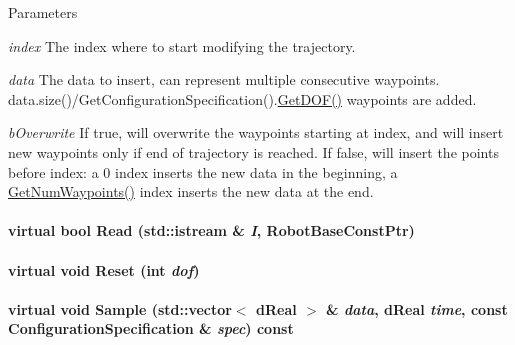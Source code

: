 \begin{DoxyParams}{Parameters}
\item[{\em index}]The index where to start modifying the trajectory. \item[{\em data}]The data to insert, can represent multiple consecutive waypoints. data.size()/GetConfigurationSpecification().\hyperlink{classOpenRAVE_1_1TrajectoryBase_a181d63496678472a4e902bcea6fea659}{GetDOF()} waypoints are added. \item[{\em bOverwrite}]If true, will overwrite the waypoints starting at index, and will insert new waypoints only if end of trajectory is reached. If false, will insert the points before index: a 0 index inserts the new data in the beginning, a \hyperlink{classOpenRAVE_1_1TrajectoryBase_aee0058cd9ab78480cbef78db3bf1fc75}{GetNumWaypoints()} index inserts the new data at the end. \end{DoxyParams}
\hypertarget{classOpenRAVE_1_1TrajectoryBase_ac92225ac78a03d41680a022e11a5f4b2}{
\paragraph[{Read}]{\setlength{\rightskip}{0pt plus 5cm}virtual bool Read (std::istream \& {\em I}, \/  RobotBaseConstPtr)}\hfill}
\label{classOpenRAVE_1_1TrajectoryBase_ac92225ac78a03d41680a022e11a5f4b2}
\hypertarget{classOpenRAVE_1_1TrajectoryBase_acfa84d2797c5b267c12d0ef048493ba0}{
\paragraph[{Reset}]{\setlength{\rightskip}{0pt plus 5cm}virtual void Reset (int {\em dof})}\hfill}
\label{classOpenRAVE_1_1TrajectoryBase_acfa84d2797c5b267c12d0ef048493ba0}
\hypertarget{classOpenRAVE_1_1TrajectoryBase_acbaf4d3d503703e9d8274b73b880e969}{
\paragraph[{Sample}]{\setlength{\rightskip}{0pt plus 5cm}virtual void Sample (std::vector$<$ dReal $>$ \& {\em data}, \/  dReal {\em time}, \/  const {\bf ConfigurationSpecification} \& {\em spec}) const}\hfill}
\label{classOpenRAVE_1_1TrajectoryBase_acbaf4d3d503703e9d8274b73b880e969}


